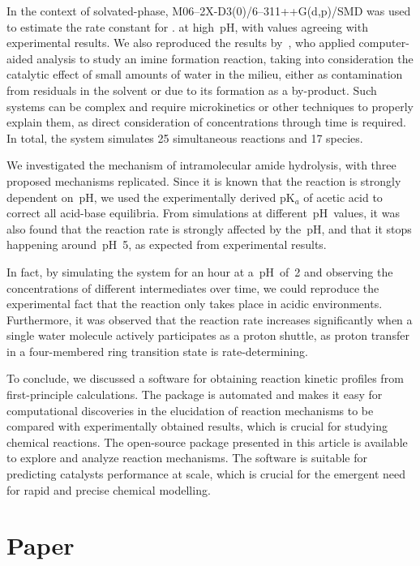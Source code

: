 In the context of solvated-phase,
M06--2X-D3(0)/6--311++G(d,p)/SMD was used to estimate the rate constant for .
at high~pH,
with values agreeing with experimental results.
We also reproduced the results by~\citeauthor{P_rez_Soto_2020},
who applied computer-aided analysis
to study an imine formation reaction,
taking into consideration the catalytic effect of small amounts of water in the milieu,
either as contamination from residuals in the solvent
or due to its formation as a by-product.
Such systems can be complex and require microkinetics or other techniques to properly explain them,
as direct consideration of concentrations through time is required.
In total,
the system simulates 25 simultaneous reactions and 17 species.

We investigated the mechanism of intramolecular amide hydrolysis,
with three proposed mechanisms replicated.
Since it is known that the reaction is strongly dependent on~pH,
we used the experimentally derived pK$_a$ of acetic acid to correct all acid-base equilibria.
From simulations at different~pH~values,
it was also found that the reaction rate is strongly affected by the~pH,
and that it stops happening around~pH~5,
as expected from experimental results.

In fact,
by simulating the system for an hour at a~pH~of~2
and observing the concentrations of different intermediates over time,
we could reproduce the experimental fact that
the reaction only takes place in acidic environments.
Furthermore,
it was observed that the reaction rate increases significantly when
a single water molecule actively participates as a proton shuttle,
as proton transfer in a four-membered ring transition state is rate-determining.

To conclude,
we discussed a software for obtaining reaction kinetic profiles from first-principle calculations.
The package is automated and makes it easy for computational discoveries in the elucidation of reaction mechanisms
to be compared with experimentally obtained results,
which is crucial for studying chemical reactions.
The open-source package presented in this article is available to explore and analyze reaction mechanisms.
The software is suitable for predicting catalysts performance at scale,
which is crucial for the emergent need for rapid and precise chemical modelling.

\section{Paper}

